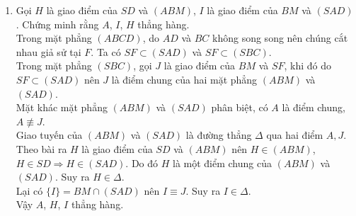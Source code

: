 \begin{bt}
{\begin{enumerate}
			Do $M \in SC$ nên $AM \subset (SAC)$. Trong mặt phẳng $(SAC)$, gọi $E$ là giao điểm của hai đường thẳng $SO$ và $AM$.\\
			Ta có $E \in SO,\ SO \subset (SBD) \Rightarrow E \in (SBD)$ và $E \in AM$.\\
			Vậy $E$ là giao điểm của $AM$ và mặt phẳng $(SBD)$.
			\item Gọi $H$ là giao điểm của $SD$ và $(ABM)$, $I$ là giao điểm của $BM$ và $(SAD)$. Chứng minh rằng $A$, $I$, $H$ thẳng hàng.\\
			Trong mặt phẳng $(ABCD)$, do $AD$ và $BC$ không song song nên chúng cắt nhau giả sử tại $F$. Ta có $SF \subset(SAD)$ và $SF \subset (SBC)$.\\
			Trong mặt phẳng $(SBC)$, gọi $J$ là giao điểm của $BM$ và $SF$, khi đó do $SF \subset (SAD)$ nên $J$ là điểm chung của hai mặt phẳng $(ABM)$ và $(SAD)$.\\
			Mặt khác mặt phẳng $(ABM)$ và $(SAD)$ phân biệt, có $A$ là điểm chung, $A \not\equiv J$.\\
			Giao tuyến của $(ABM)$ và $(SAD)$ là đường thẳng $\Delta$ qua hai điểm $A, J$.\\
			Theo bài ra $H$ là giao điểm của $SD$ và $(ABM)$ nên $H \in (ABM)$, $H \in SD \Rightarrow H \in (SAD)$. Do đó $H$ là một điểm chung của $(ABM)$ và $(SAD)$. Suy ra $H \in \Delta$.\\
			Lại có $\{I\}=BM \cap (SAD)$ nên $I \equiv J$. Suy ra $I \in \Delta$.\\
			Vậy $A$, $H$, $I$ thẳng hàng.
		\end{enumerate}			
	}
\end{bt}



